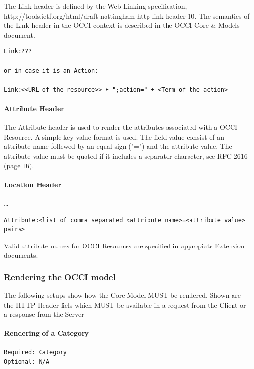 \documentclass[10pt,a4paper]{article}
\begin{document}
The Link header is defined by the Web Linking specification, http://tools.ietf.org/html/draft-nottingham-http-link-header-10. The semantics of the Link header in the OCCI context is described in the OCCI Core \& Models document.

\begin{verbatim}
Link:???

or in case it is an Action:

Link:<<URL of the resource>> + ";action=" + <Term of the action>
\end{verbatim}

\paragraph{Attribute Header}

The Attribute header is used to render the attributes associated with a OCCI Resource. A simple key-value format is used. The field value consist of an attribute name followed by an equal sign ("=") and the attribute value. The attribute value must be quoted if it includes a separator character, see RFC 2616 (page 16).

\paragraph{Location Header}

\ldots

\begin{verbatim}
Attribute:<list of comma separated <attribute name>=<attribute value> pairs>
\end{verbatim}

Valid attribute names for OCCI Resources are specified in appropiate Extension documents.

\subsubsection{Rendering the OCCI model}

The following setups show how the Core Model MUST be rendered. Shown are the HTTP Header fiels which MUST be available in a request from the Client or a response from the Server.

\paragraph{Rendering of a Category}
\begin{verbatim}
Required: Category
Optional: N/A
\end{verbatim}
\end{document}
